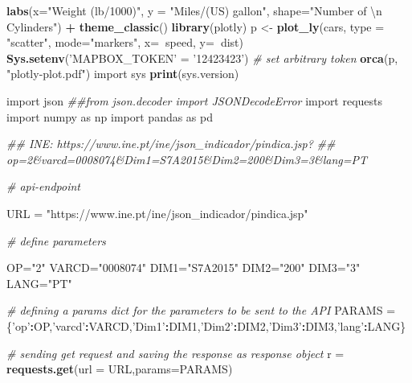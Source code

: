 \documentclass[
  12pt,
]{article}
\newenvironment{Shaded}{\begin{snugshade}}{\end{snugshade}}
\newcommand{\CharTok}[1]{\textcolor[rgb]{0.31,0.60,0.02}{#1}}
\newcommand{\CommentTok}[1]{\textcolor[rgb]{0.56,0.35,0.01}{\textit{#1}}}
\newcommand{\DataTypeTok}[1]{\textcolor[rgb]{0.13,0.29,0.53}{#1}}
\newcommand{\KeywordTok}[1]{\textcolor[rgb]{0.13,0.29,0.53}{\textbf{#1}}}
\newcommand{\NormalTok}[1]{#1}
\newcommand{\OperatorTok}[1]{\textcolor[rgb]{0.81,0.36,0.00}{\textbf{#1}}}
\newcommand{\StringTok}[1]{\textcolor[rgb]{0.31,0.60,0.02}{#1}}
\begin{document}
\begin{Shaded}
\begin{Highlighting}[]
\StringTok{  }\KeywordTok{labs}\NormalTok{(}\DataTypeTok{x=}\StringTok{"Weight (lb/1000)"}\NormalTok{, }\DataTypeTok{y =} \StringTok{"Miles/(US) gallon"}\NormalTok{, }
       \DataTypeTok{shape=}\StringTok{"Number of }\CharTok{\textbackslash{}n}\StringTok{ Cylinders"}\NormalTok{) }\OperatorTok{+}\StringTok{ }\KeywordTok{theme_classic}\NormalTok{()}
\KeywordTok{library}\NormalTok{(plotly)}
\NormalTok{p <-}\StringTok{ }\KeywordTok{plot_ly}\NormalTok{(cars, }\DataTypeTok{type =} \StringTok{"scatter"}\NormalTok{, }\DataTypeTok{mode=}\StringTok{"markers"}\NormalTok{,}
        \DataTypeTok{x=}\OperatorTok{~}\NormalTok{speed, }
        \DataTypeTok{y=}\OperatorTok{~}\NormalTok{dist)}
\KeywordTok{Sys.setenv}\NormalTok{(}\StringTok{'MAPBOX_TOKEN'}\NormalTok{ =}\StringTok{ '12423423'}\NormalTok{) }\CommentTok{# set arbitrary token}
\KeywordTok{orca}\NormalTok{(p, }\StringTok{"plotly-plot.pdf"}\NormalTok{)}
\NormalTok{import sys}
\KeywordTok{print}\NormalTok{(sys.version)}


\NormalTok{import json}
\CommentTok{##from json.decoder import JSONDecodeError}
\NormalTok{import requests}
\NormalTok{import numpy as np}
\NormalTok{import pandas as pd}

\CommentTok{## INE: https://www.ine.pt/ine/json_indicador/pindica.jsp?}
\CommentTok{## op=2&varcd=0008074&Dim1=S7A2015&Dim2=200&Dim3=3&lang=PT}

\CommentTok{# api-endpoint }

\NormalTok{URL =}\StringTok{ "https://www.ine.pt/ine/json_indicador/pindica.jsp"}
  
\CommentTok{# define parameters}

\NormalTok{OP=}\StringTok{"2"}
\NormalTok{VARCD=}\StringTok{"0008074"}
\NormalTok{DIM1=}\StringTok{"S7A2015"}
\NormalTok{DIM2=}\StringTok{"200"}
\NormalTok{DIM3=}\StringTok{"3"}
\NormalTok{LANG=}\StringTok{"PT"}


\CommentTok{# defining a params dict for the parameters to be sent to the API }
\NormalTok{PARAMS =}\StringTok{ }\NormalTok{\{}\StringTok{'op'}\OperatorTok{:}\NormalTok{OP,}\StringTok{'varcd'}\OperatorTok{:}\NormalTok{VARCD,}\StringTok{'Dim1'}\OperatorTok{:}\NormalTok{DIM1,}\StringTok{'Dim2'}\OperatorTok{:}\NormalTok{DIM2,}\StringTok{'Dim3'}\OperatorTok{:}\NormalTok{DIM3,}\StringTok{'lang'}\OperatorTok{:}\NormalTok{LANG\} }
  
\CommentTok{# sending get request and saving the response as response object }
\NormalTok{r =}\StringTok{ }\KeywordTok{requests.get}\NormalTok{(}\DataTypeTok{url =}\NormalTok{ URL,}\DataTypeTok{params=}\NormalTok{PARAMS) }
  

\end{Highlighting}
\end{Shaded}
\end{document}
